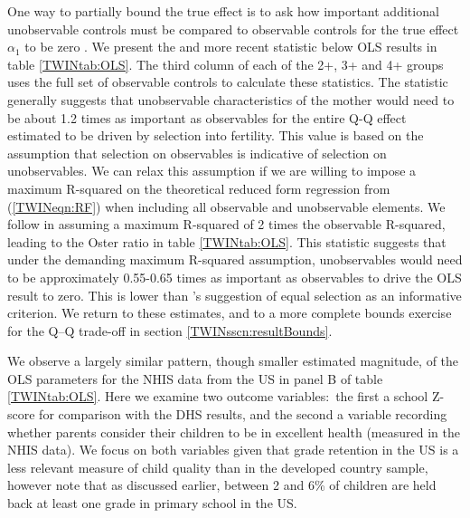 \documentclass[subeqn]{article}
\begin{document}
\begin{spacing}{1.4}
One way to partially bound the true effect is to ask how important additional
unobservable controls must be compared to observable controls for the true
effect $\alpha_1$ to be zero \citep{Altonjietal2005,Oster2013}.  We present the
\citeauthor{Altonjietal2005} and more recent \citeauthor{Oster2013} statistic
below OLS results in table \ref{TWINtab:OLS}.  The third column of each of
the 2+, 3+ and 4+ groups uses the full set of observable controls to calculate
these statistics.  The \citeauthor{Altonjietal2005} statistic generally
suggests that unobservable characteristics of the mother would need to be about
1.2 times as important as observables for the entire Q-Q effect estimated to
be driven by selection into fertility.  This value is based on the assumption
that selection on observables is indicative of selection on unobservables.  We
can relax this assumption if we are willing to impose a maximum R-squared on the 
theoretical reduced form regression from (\ref{TWINeqn:RF}) when including all 
observable and unobservable elements.  We follow \citet{Oster2013} in assuming
a maximum R-squared of 2 times the observable R-squared, leading to the Oster
ratio in table \ref{TWINtab:OLS}.  This statistic suggests that under the
demanding maximum R-squared assumption, unobservables would need to be
approximately 0.55-0.65 times as important as observables to drive the OLS
result to zero. This is lower than \citeauthor{Oster2013}'s suggestion of equal
selection as an informative criterion.  We return to these estimates, and to a
more complete bounds exercise for the Q--Q trade-off in section
\ref{TWINsscn:resultBounds}.

We observe a largely similar pattern, though smaller estimated magnitude, of
the OLS parameters for the NHIS data from the US in panel B of table
\ref{TWINtab:OLS}.  Here we examine two outcome variables:\ the first a
school Z-score for comparison with the DHS results, and the second a variable
recording whether parents consider their children to be in excellent health
(measured in the NHIS data).  We focus on both variables given that grade
retention in the US is a less relevant measure of child quality than in the
developed country sample, however note that as discussed earlier, between 2 and
6\% of children are held back at least one grade in primary school in the US.


\end{spacing}
\end{document}
